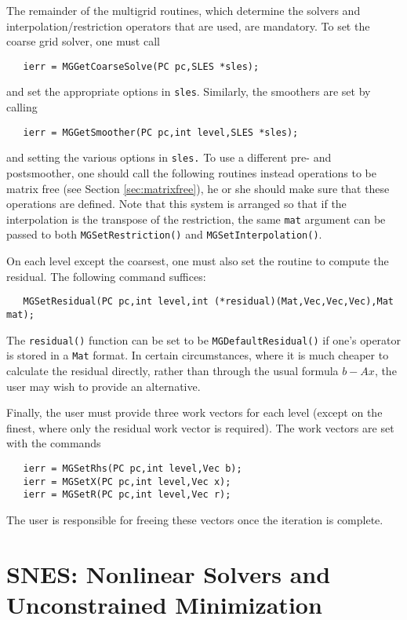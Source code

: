 The remainder of the multigrid routines, which determine
the solvers and interpolation/restriction operators that are used,
are mandatory.
To set the coarse grid solver, one must 
call 
\begin{verbatim}
   ierr = MGGetCoarseSolve(PC pc,SLES *sles);
\end{verbatim}
and set the appropriate options in {\tt sles}. Similarly, the 
smoothers are set by calling 
\begin{verbatim}
   ierr = MGGetSmoother(PC pc,int level,SLES *sles);
\end{verbatim}
and setting the various options in {\tt sles.} 
To use a different pre- and postsmoother, one should call the following
routines instead operations to be matrix free
(see Section \ref{sec:matrixfree}),
he or she should make sure that these operations are defined. 
Note that this system is arranged so that if the interpolation is 
the transpose of the restriction, the same {\tt mat} argument can be 
passed to both {\tt MGSetRestriction()} and {\tt MGSetInterpolation()}.

On each level except the coarsest, one must also set the routine to 
compute the residual.  The following command suffices: 
\begin{verbatim}
   MGSetResidual(PC pc,int level,int (*residual)(Mat,Vec,Vec,Vec),Mat mat);
\end{verbatim}
The {\tt residual()} function can be set to be {\tt MGDefaultResidual()}
if 
one's operator is stored in a {\tt Mat} format.  In certain circumstances, 
where it is much cheaper to calculate the residual directly, rather 
than through the usual formula $b - Ax$,  the user may wish to provide 
an alternative. 

Finally, the user must provide three work vectors for each level 
(except on the finest, where only the residual work vector is required).
The work vectors are set with the 
commands    
\begin{verbatim}
   ierr = MGSetRhs(PC pc,int level,Vec b);
   ierr = MGSetX(PC pc,int level,Vec x);
   ierr = MGSetR(PC pc,int level,Vec r);
\end{verbatim}
The user is responsible for freeing these vectors once the iteration 
is complete.

\chapter{SNES: Nonlinear Solvers and Unconstrained Minimization}
\label{chapter:snes}

